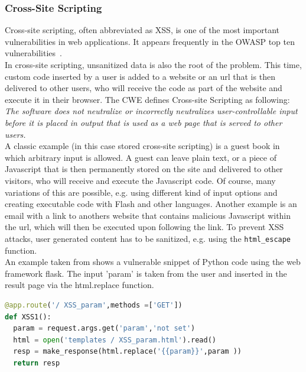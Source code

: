 \documentclass[
	a4paper,
	pagesize,
	pdftex,
	12pt,
	twoside, %
	BCOR=5mm, %
	ngerman,
	fleqn,
	final,
	]{scrartcl}
\begin{document}
\subsubsection{Cross-Site Scripting}
Cross-site scripting, often abbreviated as XSS, is one of the most important vulnerabilities in web applications. It appears frequently in the OWASP top ten vulnerabilities~\cite{OWASPFoundation.}.\\
In cross-site scripting, unsanitized data is also the root of the problem. This time, custom code inserted by a user is added to a website or an url that is then delivered to other users, who will receive the code as part of the website and execute it in their browser. The CWE defines Cross-site Scripting as following: \textit{The software does not neutralize or incorrectly neutralizes user-controllable input before it is placed in output that is used as a web page that is served to other users.}~\cite{CommonWeaknessEnumeration.19.09.2019}\\
A classic example (in this case stored cross-site scripting) is a guest book in which arbitrary input is allowed. A guest can leave plain text, or a piece of Javascript that is then permanently stored on the site and delivered to other visitors, who will receive and execute the Javascript code. Of course, many variations of this are possible, e.g. using different kind of input options and creating executable code with Flash and other languages. Another example is an email with a link to anothers website that contains malicious Javascript within the url, which will then be executed upon following the link. 
To prevent XSS attacks, user generated content has to be sanitized, e.g. using the \texttt{html\_escape} function.\\
An example taken from \cite{Micheelsen.2016} shows a vulnerable snippet of Python code using the web framework flask. The input 'param' is taken from the user and inserted in the result page via the html.replace function.
\begin{lstlisting}[language=Python, showstringspaces=False]
@app.route('/ XSS_param',methods =['GET'])
def XSS1():
  param = request.args.get('param','not set')
  html = open('templates / XSS_param.html').read()
  resp = make_response(html.replace('{{param}}',param ))
  return resp
\end{lstlisting}
\end{document}
